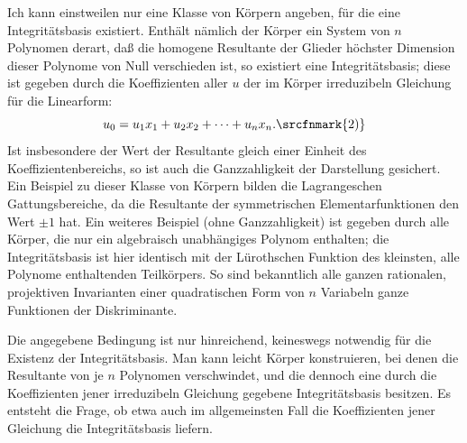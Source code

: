Ich kann einstweilen nur eine Klasse von Körpern angeben, für die eine Integritätsbasis existiert. Enthält nämlich der Körper ein System von $n$ Polynomen derart, daß die homogene Resultante der Glieder höchster Dimension dieser Polynome von Null verschieden ist, so existiert eine Integritätsbasis; diese ist gegeben durch die Koeffizienten aller $u$ der im Körper irreduzibeln Gleichung für die Linearform:
\[
  u_0=u_1x_1+u_2x_2+\cdots+u_nx_n.\srcfnmark{2)}
\]
Ist insbesondere der Wert der Resultante gleich einer Einheit des Koeffizientenbereichs, so ist auch die Ganzzahligkeit der Darstellung gesichert. Ein Beispiel zu dieser Klasse von Körpern bilden die Lagrangeschen Gattungsbereiche, da die Resultante der symmetrischen Elementarfunktionen den Wert $\pm 1$ hat. Ein weiteres Beispiel (ohne Ganzzahligkeit) ist gegeben durch alle Körper, die nur ein algebraisch unabhängiges Polynom enthalten; die Integritätsbasis ist hier identisch mit der Lürothschen Funktion des kleinsten, alle Polynome enthaltenden Teilkörpers. So sind bekanntlich alle ganzen rationalen, projektiven Invarianten einer quadratischen Form von $n$ Variabeln ganze Funktionen der Diskriminante.

Die angegebene Bedingung ist nur hinreichend, keineswegs notwendig für die Existenz der Integritätsbasis. Man kann leicht Körper konstruieren, bei denen die Resultante von je $n$ Polynomen verschwindet, und die dennoch eine durch die Koeffizienten jener irreduzibeln Gleichung gegebene Integritätsbasis besitzen. Es entsteht die Frage, ob etwa auch im allgemeinsten Fall die Koeffizienten jener Gleichung die Integritätsbasis liefern.
